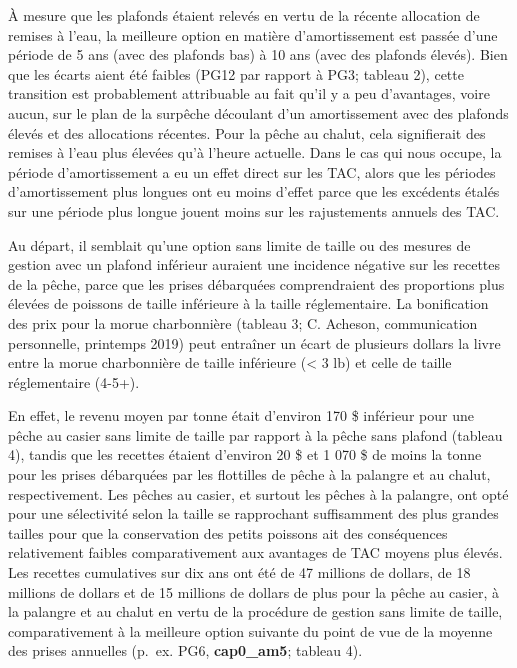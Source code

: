 \documentclass[11pt]{book}
\begin{document}
À mesure que les plafonds étaient relevés en vertu de la récente allocation de remises à l'eau, la meilleure option en matière d'amortissement est passée d'une période de 5 ans (avec des plafonds bas) à 10 ans (avec des plafonds élevés). Bien que les écarts aient été faibles (PG12 par rapport à PG3; tableau 2), cette transition est probablement attribuable au fait qu'il y a peu d'avantages, voire aucun, sur le plan de la surpêche découlant d'un amortissement avec des plafonds élevés et des allocations récentes. Pour la pêche au chalut, cela signifierait des remises à l'eau plus élevées qu'à l'heure actuelle. Dans le cas qui nous occupe, la période d'amortissement a eu un effet direct sur les TAC, alors que les périodes d'amortissement plus longues ont eu moins d'effet parce que les excédents étalés sur une période plus longue jouent moins sur les rajustements annuels des TAC.

Au départ, il semblait qu'une option sans limite de taille ou des mesures de gestion avec un plafond inférieur auraient une incidence négative sur les recettes de la pêche, parce que les prises débarquées comprendraient des proportions plus élevées de poissons de taille inférieure à la taille réglementaire. La bonification des prix pour la morue charbonnière (tableau 3; C. Acheson, communication personnelle, printemps 2019) peut entraîner un écart de plusieurs dollars la livre entre la morue charbonnière de taille inférieure (\textless{} 3 lb) et celle de taille réglementaire (4-5+).

En effet, le revenu moyen par tonne était d'environ 170 \$ inférieur pour une pêche au casier sans limite de taille par rapport à la pêche sans plafond (tableau 4), tandis que les recettes étaient d'environ 20 \$ et 1 070 \$ de moins la tonne pour les prises débarquées par les flottilles de pêche à la palangre et au chalut, respectivement. Les pêches au casier, et surtout les pêches à la palangre, ont opté pour une sélectivité selon la taille se rapprochant suffisamment des plus grandes tailles pour que la conservation des petits poissons ait des conséquences relativement faibles comparativement aux avantages de TAC moyens plus élevés. Les recettes cumulatives sur dix ans ont été de 47 millions de dollars, de 18 millions de dollars et de 15 millions de dollars de plus pour la pêche au casier, à la palangre et au chalut en vertu de la procédure de gestion sans limite de taille, comparativement à la meilleure option suivante du point de vue de la moyenne des prises annuelles (p.~ex. PG6, \textbf{cap0\_am5}; tableau 4).
\end{document}

